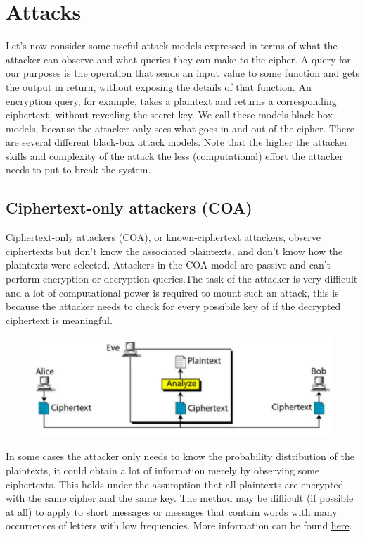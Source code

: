  
\section{Attacks}
Let’s now consider some useful attack models expressed in terms of what the attacker can observe and what queries they can make to the cipher. A query for our purposes is the operation that sends an input value to some function and gets the output in return, without exposing the details of that function. An encryption query, for example, takes a plaintext and returns a corresponding ciphertext, without revealing the secret key. We call these models black-box models, because the attacker only sees what goes in and out of the cipher.
There are several different black-box attack models.  Note that the higher the attacker skills and complexity of the attack the less (computational) effort the attacker needs to put to break the system.

	\subsection{Ciphertext-only attackers (COA)}
	Ciphertext-only attackers (COA), or known-ciphertext attackers, observe ciphertexts but don’t know the 	associated plaintexts, and don’t know how the plaintexts were selected. Attackers in the COA model are passive and can’t perform encryption or decryption queries.The task of the attacker is very difficult and a lot of computational power is required to mount such an attack, this is because the attacker needs to check for every possibile key of if the decrypted ciphertext is meaningful.
	\begin{figure}
		\centering
		\includegraphics[width=0.7\linewidth]{Images/Chapter1/screenshot001}
		\caption{}
		\label{fig:screenshot001}
	\end{figure}
	
	In some cases the attacker only needs to know the probability distribution of the plaintexts, it could obtain a lot of information merely by observing some ciphertexts. This holds under the assumption that all plaintexts are encrypted with the same cipher and the same key. The method may be difficult (if possible at all) to apply to short messages or messages that contain words with many occurrences of letters with low frequencies. More information can be found \href{https://crypto.interactive-maths.com/frequency-analysis-breaking-the-code.html}{here}.
	
